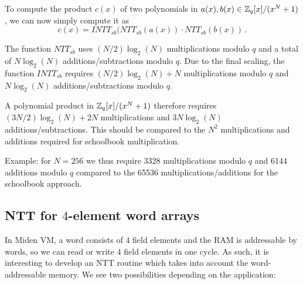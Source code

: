\begin{algorithm}[!t] \label{algo:intt_sb}
\begin{scriptsize}
\caption{\emph{$INTT_{sb}$}}
\end{scriptsize}
\end{algorithm} 

To compute the product $c(x)$ of two polynomials in $a(x), b(x) \in \mathbb{Z}_q[x]/(x^N+1)$, we can now simply compute it as 
\[  c(x) = INTT_{sb}(NTT_{sb}(a(x)) \cdot NTT_{sb}(b(x)) \, . \]

The function $NTT_{sb}$ uses $(N/2) \log_2(N)$ multiplications modulo $q$ and a total of $N \log_2(N)$ additions/subtractions modulo $q$.
Due to the final scaling, the function $INTT_{sb}$ requires $(N/2) \log_2(N) + N$ multiplications modulo $q$ and 
$N \log_2(N)$ additions/subtractions modulo $q$.

A polynomial product in $\mathbb{Z}_q[x]/(x^N+1)$ therefore requires $(3N/2) \log_2(N) + 2N$ multiplications and $3 N \log_2(N)$ 
additions/subtractions.  This should be compared to the $N^2$ multiplications and additions required for schoolbook multiplication.

Example: for $N = 256$ we thus require 3328 multiplications modulo $q$ and 6144 additions modulo $q$ compared to the 
65536 multiplications/additions for the schoolbook approach.

\subsection{NTT for $4$-element word arrays}

In Miden VM, a word consists of $4$ field elements and the RAM is addressable by words, so we can read or write 4 field
elements in one cycle.  As such, it is interesting to develop an NTT routine which takes into account the word-addressable
memory.   We see two possibilities depending on the application:

